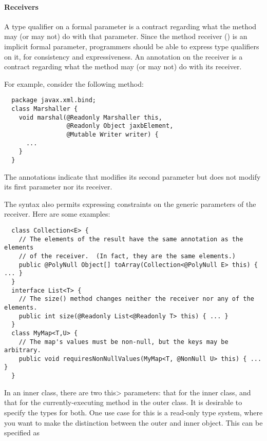 \documentclass[10pt]{article}
\begin{document}
\paragraph{Receivers\label{receivers}}
A type qualifier on a formal parameter is a contract regarding what the
method may (or may not) do with that parameter.  Since the method receiver
() is an implicit formal parameter, programmers should be able
to express type qualifiers on it, for consistency and expressiveness.  An
annotation on the receiver is a contract regarding what the method may
(or may not) do with its receiver.



For example, consider the following method:

\preverbnegspace
\begin{Verbatim}
  package javax.xml.bind;
  class Marshaller {
    void marshal(@Readonly Marshaller this,
                 @Readonly Object jaxbElement,
                 @Mutable Writer writer) {
      ...
    }
  }
\end{Verbatim}

\noindent
The annotations indicate that  modifies its second parameter
but does not modify its first parameter nor its receiver.

The syntax also permits expressing constraints on the
generic parameters of the receiver.  Here are some examples:

\preverbnegspace
\begin{Verbatim}
  class Collection<E> {
    // The elements of the result have the same annotation as the elements
    // of the receiver.  (In fact, they are the same elements.)
    public @PolyNull Object[] toArray(Collection<@PolyNull E> this) { ... }
  }
  interface List<T> {
    // The size() method changes neither the receiver nor any of the elements.
    public int size(@Readonly List<@Readonly T> this) { ... }
  }
  class MyMap<T,U> {
    // The map's values must be non-null, but the keys may be arbitrary.
    public void requiresNonNullValues(MyMap<T, @NonNull U> this) { ... }
  }
\end{Verbatim}

In an inner class, there are two \<this> parameters:  that for the inner
class, and that for the currently-executing method in the outer class.  It
is desirable to specify the types for both.  
One use case for this is a read-only type system, where you want to
make the distinction between the outer and inner object.
This can be specified as
\end{document}
